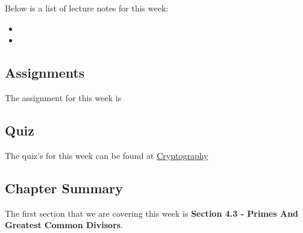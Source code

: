\noindent Below is a list of lecture notes for this week:

\begin{itemize}
    \item {}
    \item {}
\end{itemize}

\subsection{Assignments}

The assignment for this week is   

\subsection{Quiz}

The quiz's for this week can be found at \href{https://applied.cs.colorado.edu/mod/quiz/view.php?id=51735}{Cryptography} \textbullet {}  

\subsection{Chapter Summary}

The first section that we are covering this week is \textbf{Section 4.3 - Primes And Greatest Common Divisors}.


